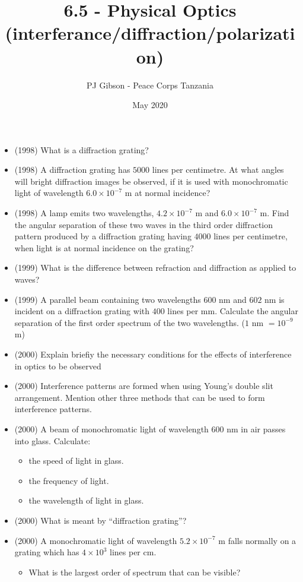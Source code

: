 \documentclass{article}
\title{\textbf{6.5 - Physical Optics (interferance/diffraction/polarization)}}
\author{PJ Gibson - Peace Corps Tanzania}
\date{May 2020}
\begin{document}
\maketitle

\begin{itemize}
\item (1998)  What is a diffraction grating?
\item (1998)  A diffraction grating has $ 5000$ lines per centimetre. At what angles will bright diffraction images be observed, if it is used with monochromatic light of wavelength $ 6.0 \times 10^{-7}$ m at normal incidence?
\item (1998)  A lamp emits two wavelengths, $ 4.2 \times 10^{-7}$ m and $ 6.0 \times 10^{-7}$ m. Find the angular separation of these two waves in the third order diffraction pattern produced by a diffraction grating having $ 4000$ lines per centimetre, when light is at normal incidence on the grating?
\item (1999)  What is the difference between refraction and diffraction as applied to waves?
\item (1999)  A parallel beam containing two wavelengths $ 600$ nm and $ 602$ nm is incident on a diffraction grating with $ 400$ lines per mm. Calculate the angular separation of the first order spectrum of the two wavelengths. ($ 1$ nm $ =10^{-9}$ m)
\item (2000)  Explain briefiy the necessary conditions for the effects of interference in optics to be observed
\item (2000)  Interference patterns are formed when using Young’s double slit arrangement. Mention other three methods that can be used to form interference patterns.
\item (2000)  A beam of monochromatic light of wavelength $ 600$ nm in air passes into glass. Calculate:
 \begin{itemize}
\item the speed of light in glass.
\item the frequency of light.
\item the wavelength of light in glass.
\end{itemize}
\item (2000)  What is meant by “diffraction grating”?
\item (2000)  A monochromatic light of wavelength $ 5.2 \times 10^{-7}$ m falls normally on a grating which has $ 4 \times 10^{3}$ lines per cm.
 \begin{itemize}
\item What is the largest order of spectrum that can be visible?

\end{itemize}
\end{itemize}
\end{document}
